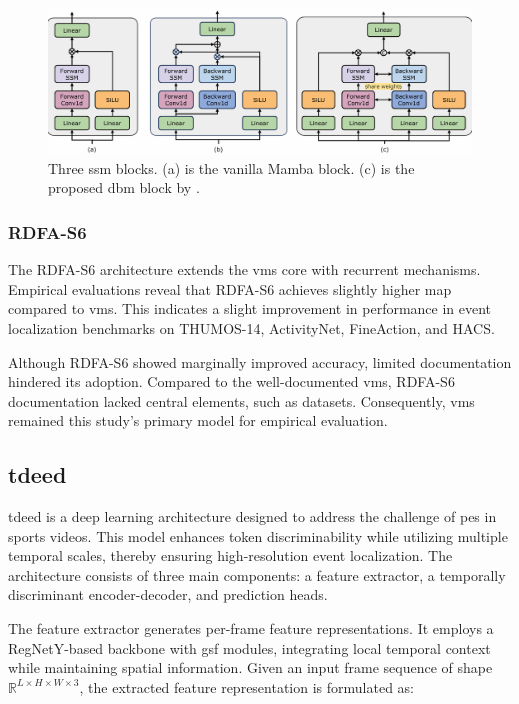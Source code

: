 \begin{figure}
    \centering
    \includegraphics[width=1\linewidth]{figures/mamba_ssm.png}
    \caption{Three \acrshort{ssm} blocks. (a) is the vanilla Mamba block\cite{gu_mamba_2024}. (c) is the proposed \acrshort{dbm} block by \textcite{li_videomamba_2024}.}
    \label{fig:mamba_ssm}
\end{figure}

\subsubsection{RDFA-S6}
The RDFA-S6 architecture extends the \acrshort{vms} core with recurrent mechanisms. Empirical evaluations reveal that RDFA-S6 achieves slightly higher \acrlong{map} compared to \acrshort{vms}. This indicates a slight improvement in performance in event localization benchmarks on THUMOS-14, ActivityNet, FineAction, and HACS. 

Although RDFA-S6 showed marginally improved accuracy, limited documentation hindered its adoption. Compared to the well-documented \acrlong{vms}, RDFA-S6 documentation lacked central elements, such as datasets. Consequently, \acrshort{vms} remained this study's primary model for empirical evaluation. 


\subsection{\acrfull{tdeed}}
\label{ssec:tdeed}

\acrfull{tdeed} is a deep learning architecture designed to address the challenge of \acrfull{pes} in sports videos. This model enhances token discriminability while utilizing multiple temporal scales, thereby ensuring high-resolution event localization. The architecture consists of three main components: a feature extractor, a temporally discriminant encoder-decoder, and prediction heads\cite{xarles_t-deed_2024}.

The feature extractor generates per-frame feature representations. It employs a RegNetY-based backbone with \acrfull{gsf} modules, integrating local temporal context while maintaining spatial information. Given an input frame sequence of shape \(\mathbb{R}^{L \times H \times W \times 3}\), the extracted feature representation is formulated as:

